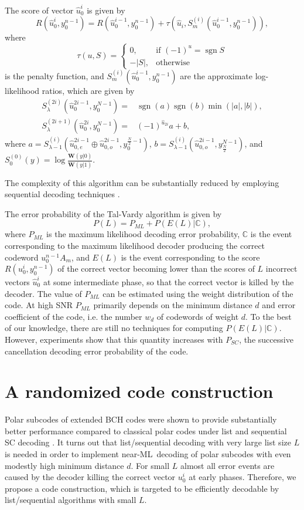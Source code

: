 \documentclass[conference]{IEEEtran}
\theoremstyle{plain}
\DeclareMathOperator{\sgn}{sgn}
\begin{document}
The score of vector $\hat u_0^i$ is given by 
\begin{equation}
\label{mScore}
R(\hat u_0^{i},y_0^{n-1})=R(\hat u_0^{i-1},y_0^{n-1})+\tau(\hat u_i,S_m^{(i)}(\hat u_0^{i-1},y_0^{n-1})),
\end{equation} 
where $$\tau(u,S)=\begin{cases}
0,&\text{if $(-1)^u=\sgn S$}\\
-|S|,&\text{otherwise}
\end{cases}
$$
is the penalty function, 
and $S_m^{(i)}(\hat u_0^{i-1},y_0^{n-1})$ are the approximate log-likelihood ratios, which are given by
\begin{align}
\label{mMinSum1}
S_{\lambda}^{(2i)}(\hat u_0^{2i-1},y_0^{N-1})=&\sgn (a)\sgn (b)\min(|a|,|b|),\\
\label{mMinSum2}
S_{\lambda}^{(2i+1)}(\hat u_0^{2i},y_0^{N-1})=&(-1)^{\hat u_{2i}}a+b,
\end{align}
where $a=S_{\lambda-1}^{(i)}(\hat u_{0,e}^{2i-1}\oplus \hat u_{0,o}^{2i-1},y_0^{\frac{N}{2}-1})$, $b=S_{\lambda-1}^{(i)}(\hat u_{0,o}^{2i-1},y_{\frac{N}{2}}^{N-1})$, and $S_0^{(0)}(y)=\log\frac{\mathbf W(y|0)}{\mathbf W(y|1)}$. 

The complexity of this algorithm can be substantially reduced by employing sequential decoding techniques \cite{miloslavskaya2014sequential}.

The error probability of the Tal-Vardy algorithm is given by $$P(L)=P_{ML}+P(E(L)|\mathbb C),$$
where $P_{ML}$ is the maximum likelihood decoding error probability, $\mathbb C$ is the event corresponding to the maximum likelihood decoder producing the correct codeword $u_0^{n-1}A_m$, and $E(L)$ is the event corresponding to the score $R(u_0^i,y_0^{n-1})$ of the correct vector becoming lower than the scores of $L$ incorrect vectors $\hat u_0^i$ at some intermediate phase, so that the correct vector is killed by the decoder. The value of $P_{ML}$ can be estimated using  the weight distribution of the code. At high SNR $P_{ML}$  primarily depends on the minimum distance $d$ and error coefficient of the code, i.e. the number $w_d$ of codewords of weight $d$. To the best of our knowledge, there are still no techniques for computing $P(E(L)|\mathbb C)$. However, experiments show that this quantity increases with $P_{SC}$, the successive cancellation decoding error probability of the code. 


\section{A randomized code construction}
\label{sConstruction}
Polar subcodes of extended BCH codes were shown to provide substantially better performance compared to  classical polar codes under list and sequential SC decoding \cite{trifonov2016polar}. It turns out that list/sequential decoding with very large list size $L$ is needed in order to implement near-ML\ decoding of polar subcodes with even modestly high minimum distance $d$. For small $L$ almost all error events are caused by the decoder killing the correct vector $u_0^i$ at early phases. Therefore, we propose a code construction, which is   targeted to be efficiently decodable by list/sequential algorithms with small $L$.
\end{document}
